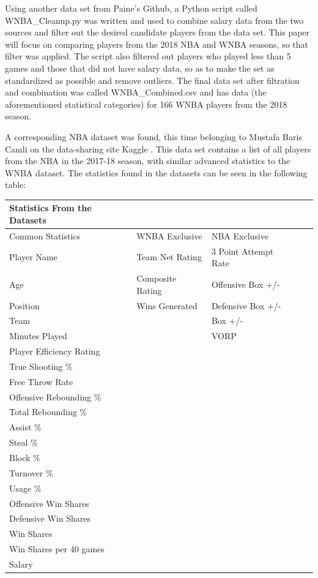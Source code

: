 \documentclass[12pt]{article}
\begin{document}
\par
Using another data set from Paine’s Github, a Python script called WNBA\_Cleanup.py was written and used to combine salary data from the two sources and filter out the desired candidate players from the data set. This paper will focus on comparing players from the 2018 NBA and WNBA seasons, so that filter was applied. The script also filtered out players who played less than 5 games and those that did not have salary data, so as to make the set as standardized as possible and remove outliers. The final data set after filtration and combination was called WNBA\_Combined.csv and has data (the aforementioned statistical categories) for 166 WNBA players from the 2018 season.
\par
A corresponding NBA dataset was found, this time belonging to Mustafa Baris Camli on the data-sharing site Kaggle \citep{nba}. This data set contains a list of all players from the NBA in the 2017-18 season, with similar advanced statistics to the WNBA dataset. The statistics found in the datasets can be seen in the following table:
\newline
\par
\begin{tabular}{*5l} 
\toprule
Statistics From the Datasets \\\midrule

Common Statistics & WNBA Exclusive & NBA Exclusive\\ 
\hline
 Player Name  &  Team Net Rating & 3 Point Attempt Rate  \\
 Age &  Composite Rating & Offensive Box +/-      \\ 
 Position &  Wins Generated & Defensive Box +/-\\
 Team &  & Box +/-     \\         
 Minutes Played &  & VORP       \\
 Player Efficiency Rating & &      \\
 True Shooting \% & & \\
 Free Throw Rate & &\\
 Offensive Rebounding \% & & \\
 Total Rebounding \% & & \\
 Assist \% & & \\
 Steal \% & & \\
 Block \% & & \\
 Turnover \% & & \\
 Usage \% & & \\
 Offensive Win Shares & & \\
 Defensive Win Shares  & & \\
 Win Shares & & \\
 Win Shares per 40 games & & \\
 Salary & & \\
 
 \hline
\end{tabular}
\end{document}
